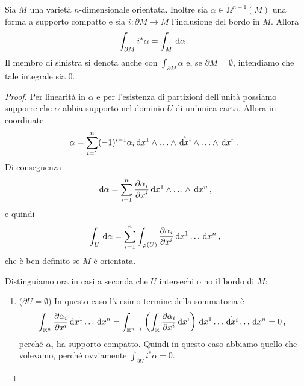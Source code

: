 \begin{theorem} [Stokes] \label{thm:Stokes} 
	Sia $M$ una varietà $n$-dimensionale orientata. Inoltre sia $\alpha \in \Omega^{n-1}(M)$ una forma a supporto compatto e sia $i:\partial M \to M$ l'inclusione del bordo in $M$. Allora
	\begin{equation*}
		\int_{\partial M} i^*\alpha = \int_M \,\mathrm d \alpha \, \text{. }
	\end{equation*}
	Il membro di sinistra si denota anche con $\int_{\partial M} \alpha$ e, se $\partial M = \emptyset$, intendiamo che tale integrale sia 0.
\end{theorem}
\begin{proof}
	Per linearità in $\alpha$ e per l'esistenza di partizioni dell'unità possiamo supporre che $\alpha$ abbia supporto nel dominio $U$ di un'unica carta.
	Allora in coordinate
	\begin{equation*}
		\alpha = \sum_{i=1}^n (-1)^{i-1} \alpha_i \,\mathrm d x^1 \wedge \ldots \wedge \hat{\,\mathrm d x^i} \wedge \ldots \wedge \,\mathrm d x^n \, \text{. }
	\end{equation*}
	Di conseguenza
	\begin{equation*}
		\,\mathrm d \alpha = \sum_{i=1}^n \frac{\partial \alpha_i}{\partial x^i} \,\mathrm d x^1\wedge \ldots \wedge \,\mathrm d x^{n} \, \text{, }
	\end{equation*}
	e quindi
	\begin{equation*}
		\int_U \,\mathrm d \alpha = \sum_{i=1}^n \int_{\varphi(U)} \frac{\partial \alpha_i}{\partial x^i} \,\mathrm d x^1 \ldots  \,\mathrm d x^{n} \, \text{, }
	\end{equation*}
	che è ben definito se $M$ è orientata.
	
	Distinguiamo ora in casi a seconda che $U$ intersechi o no il bordo di $M$:
	\begin{enumerate}
		\item ($\partial U = \emptyset$) In questo caso l'$i$-esimo termine della sommatoria è
		\begin{equation*}
			\int_{\mathbb R^n} \frac{\partial \alpha_i}{\partial x^i} \,\mathrm d x^1 \ldots  \,\mathrm d x^{n} = \int_{\mathbb R^{n-1}} \left(\int_{\mathbb R} \frac{\partial \alpha_i}{\partial x^i} \,\mathrm d x^i \right) \,\mathrm d x^1  \ldots \hat{\,\mathrm d x^i} \ldots \,\mathrm d x^n = 0 \, \text{, }
		\end{equation*}
		perché $\alpha_i$ ha supporto compatto. Quindi in questo caso abbiamo quello che volevamo, perché ovviamente $\int_{\partial U} i^*\alpha = 0$.
		

\end{enumerate}
\end{proof}
